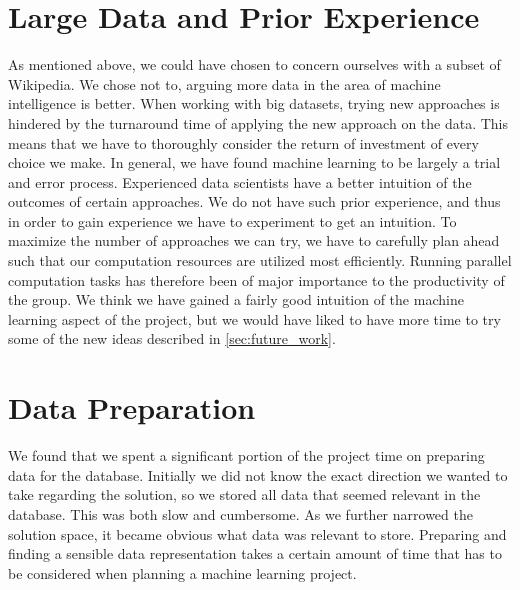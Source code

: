 \section{Large Data and Prior Experience}
As mentioned above, we could have chosen to concern ourselves with a subset of Wikipedia. We chose not to, arguing more data in the area of machine intelligence is better. When working with big datasets, trying new approaches is hindered by the turnaround time of applying the new approach on the data. This means that we have to thoroughly consider the return of investment of every choice we make. In general, we have found machine learning to be largely a trial and error process. Experienced data scientists have a better intuition of the outcomes of certain approaches. We do not have such prior experience, and thus in order to gain experience we have to experiment to get an intuition. To maximize the number of approaches we can try, we have to carefully plan ahead such that our computation resources are utilized most efficiently. Running parallel computation tasks has therefore been of major importance to the productivity of the group. We think we have gained a fairly good intuition of the machine learning aspect of the project, but we would have liked to have more time to try some of the new ideas described in \cref{sec:future_work}.

\section{Data Preparation}
We found that we spent a significant portion of the project time on preparing data for the database. Initially we did not know the exact direction we wanted to take regarding the solution, so we stored all data that seemed relevant in the database. This was both slow and cumbersome. As we further narrowed the solution space, it became obvious what data was relevant to store. Preparing and finding a sensible data representation takes a certain amount of time that has to be considered when planning a machine learning project.

